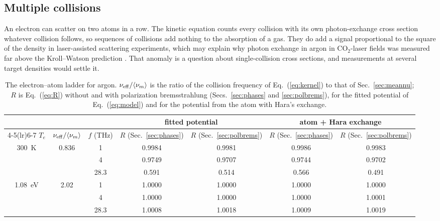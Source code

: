 \documentclass[11pt]{article}
\numberwithin{equation}{section}
\newcommand{\nueff}{\nu_{\rm eff}}
\begin{document}
\subsection{Multiple collisions}
\label{sec:multiple}
An electron can scatter on two atoms in a row. The kinetic equation counts every collision with
its own photon-exchange cross section whatever collision follows, so sequences of collisions add
nothing to the absorption of a gas. They do add a signal proportional to the square of the
density in laser-assisted scattering experiments, which may explain why photon exchange in argon
in CO$_2$-laser fields was measured far above the Kroll--Watson prediction
\cite{WallbankHolmes1994,Rabadan1996}. That anomaly is a question about single-collision cross
sections, and measurements at several target densities would settle it.

\begin{table}[ht]
\caption{The electron--atom ladder for argon. $\nueff/\langle\nu_m\rangle$ is the ratio of the collision frequency
of Eq.~(\ref*{eq:kernel}) to that of Sec.~\ref*{sec:meannu}; $R$ is Eq.~(\ref*{eq:R}) without and with polarization
bremsstrahlung (Secs.~\ref*{sec:phases} and \ref*{sec:polbrems}), for the fitted potential of Eq.~(\ref*{eq:model}) and for the potential from the
atom with Hara's exchange.}
\label{tab:gas}
\begin{center}
\begin{tabular}{ccccccc}
\toprule
& & & \multicolumn{2}{c}{fitted potential} & \multicolumn{2}{c}{atom + Hara exchange}\\
\cmidrule(lr){4-5}\cmidrule(lr){6-7}
$T_e$ & $\nueff/\langle\nu_m\rangle$ & $f$ (THz) & $R$ (Sec.~\ref*{sec:phases}) & $R$ (Sec.~\ref*{sec:polbrems}) & $R$ (Sec.~\ref*{sec:phases}) & $R$ (Sec.~\ref*{sec:polbrems})\\
\midrule
300~K & 0.836 & 1 & 0.9984 & 0.9981 & 0.9986 & 0.9983\\
 & & 4 & 0.9749 & 0.9707 & 0.9744 & 0.9702\\
 & & 28.3 & 0.591 & 0.514 & 0.566 & 0.491\\
1.08~eV & 2.02 & 1 & 1.0000 & 1.0000 & 1.0000 & 1.0000\\
 & & 4 & 1.0000 & 1.0000 & 1.0000 & 1.0001\\
 & & 28.3 & 1.0008 & 1.0018 & 1.0009 & 1.0019\\
\bottomrule
\end{tabular}
\end{center}
\end{table}
\end{document}
